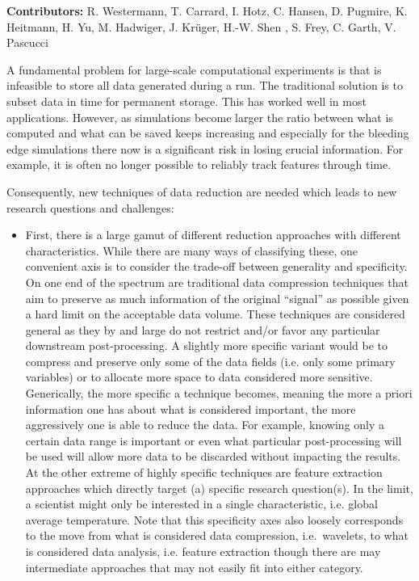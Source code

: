 \license

\begin{refsection}

\textbf{\sffamily Contributors:} R. Westermann, T. Carrard, I. Hotz, C. Hansen, D. Pugmire, K. Heitmann, H. Yu, M. Hadwiger, J. Krüger, H.-W. Shen , S. Frey, C. Garth, V. Pascucci


A fundamental problem for large-scale computational experiments is that is infeasible to store all data generated during a run. The traditional solution is to subset data in time for permanent storage. This has worked well in most applications. However, as simulations become larger the ratio between what is computed and what can be saved keeps increasing and especially for the bleeding edge simulations there now is a significant risk in losing crucial information. For example, it is often no longer possible to reliably track features \cite{Widanagamaachchi15} through time.

Consequently, new techniques of data reduction are needed which leads to new research questions and challenges:

\begin{itemize}
\item
First, there is a large gamut of different reduction approaches with different characteristics. While there are many ways of classifying these, one convenient axis is to consider the trade-off between generality and specificity. On one end of the spectrum are traditional data compression techniques that aim to preserve as much information of the original “signal” as possible given a hard limit on the acceptable data volume. These techniques are considered general as they by and large do not restrict and/or favor any particular downstream post-processing. A slightly more specific variant would be to compress and preserve only some of the data fields (i.e. only some primary variables) or to allocate more space to data considered more sensitive. Generically, the more specific a technique becomes, meaning the more a priori information one has about what is considered important, the more aggressively one is able to reduce the data. For example, knowing only a certain data range is important or even what particular post-processing will be used will allow more data to be discarded without impacting the results. At the other extreme of highly specific techniques are feature extraction approaches which directly target (a) specific research question(s). In the limit, a scientist might only be interested in a single characteristic, i.e. global average temperature. Note that this specificity axes also loosely corresponds to the move from what is considered data compression, i.e.\ wavelets, to what is considered data analysis, i.e. feature extraction though there are may intermediate approaches that may not easily fit into either category.


\end{itemize}
\end{refsection}
